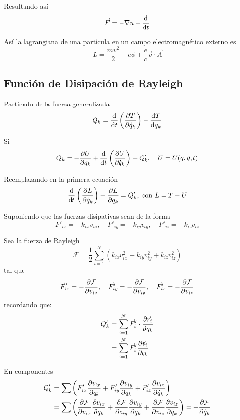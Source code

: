 \documentclass[../main]{subfiles}
\begin{document}
Resultando así
\begin{equation*}
    \vec{F}=-\nabla u-\dv{}{t}(\nabla_v \vec{v})
\end{equation*}

Así la lagrangiana de una partícula en un campo electromagnético externo es
\begin{equation*}
    L=\dfrac{mv^2}{2}-e\phi+\dfrac{e}{c}\vec{v}\cdot \vec{A}
\end{equation*}

\subsection{Función de Disipación de Rayleigh}
Partiendo de la fuerza generalizada
\begin{equation}
    Q_k=\dv{}{t}\left(\pdv{T}{\dot{q}_k}\right)-\dv{T}{q_k}
\end{equation}

Si
\begin{equation}
    Q_k=-\pdv{U}{q_k}+\dv{}{t}\left(\pdv{U}{\dot{q}_k}\right)+Q'_k,\quad U=U(q,\dot{q},t)
\end{equation}

Reemplazando en la primera ecuación
\begin{equation}
    \dv{}{t}\left(\pdv{L}{\dot{q}_k}\right)-\pdv{L}{q_k}=Q'_k, \ \text{con} \ L=T-U
\end{equation}

Suponiendo que las fuerzas disipativas sean de la forma
\begin{equation}
    F'_{ix}=-k_{ix}v_{ix},\quad F'_{iy}=-k_{iy}v_{iy},\quad F'_{iz}=-k_{iz}v_{iz}
\end{equation}

Sea la fuerza de Rayleigh
\begin{equation}
    \mathcal{F}=\dfrac{1}{2}\sum_{i=1}^N \left(k_{ix}v^2_{ix}+k_{iy}v^2_{iy}+k_{iz}v^2_{iz}\right)
\end{equation}
tal que
\begin{equation}
    \vec{F}'_{ix}=-\pdv{\mathcal{F}}{v_{ix}},\quad \vec{F}'_{iy}=-\pdv{\mathcal{F}}{v_{iy}},\quad \vec{F}'_{iz}=-\pdv{\mathcal{F}}{v_{iz}}
\end{equation}
recordando que:
\begin{align*}
    Q'_k&=\sum_{i=1}^N \vec{F}'_i \cdot \pdv{\vec{r}_i}{q_k}\\
    &=\sum_{i=1}^N \vec{F}'_i \pdv{\vec{v}_i}{\dot{q}_k}
\end{align*}

En componentes
\begin{equation}
    \begin{split}
        Q'_k&=\sum \left(F'_{ix}\pdv{v_{ix}}{q_k}+F'_{iy}\pdv{v_{iy}}{q_k}+F'_{iz}\pdv{v_{iz}}{\dot{q}_k}\right)\\
        &=\sum\left(\pdv{\mathcal{F}}{v_{ix}}\pdv{v_{ix}}{q_k}+\pdv{\mathcal{F}}{v_{iy}}\pdv{v_{iy}}{q_k}+\pdv{\mathcal{F}}{v_{iz}}\pdv{v_{iz}}{\dot{q}_k}\right)=-\pdv{\mathcal{F}}{\dot{q}_k}
    \end{split}
\end{equation}
\end{document}
